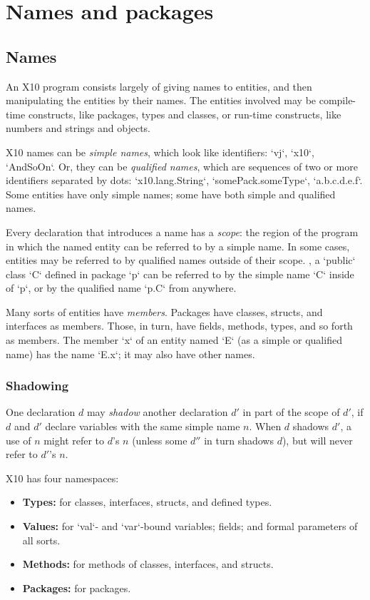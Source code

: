 \chapter{Names and packages}
\label{packages} 

\section{Names}

An X10 program consists largely of giving names to entities, and then
manipulating the entities by their names. The entities involved may be
compile-time constructs, like packages, types and classes, or run-time
constructs, like numbers and strings and objects.  

X10 names can be {\em simple names}, which look like identifiers: \xcd`vj`,
\xcd`x10`, \xcd`AndSoOn`. Or, they can be {\em qualified names}, which are
sequences of two or more identifiers separated by dots: \xcd`x10.lang.String`, 
\xcd`somePack.someType`, \xcd`a.b.c.d.e.f`.   Some entities have only simple
names; some have both simple and qualified names.

Every declaration that introduces a name has a {\em scope}: the region of the
program in which the named entity can be referred to by a simple name.  
In some cases, entities may be referred to by qualified names outside of their
scope.  \Eg, a \xcd`public` class \xcd`C` defined in package \xcd`p` can be
referred to by the simple name \xcd`C` inside of \xcd`p`, or by the qualified
name \xcd`p.C` from anywhere.  

Many sorts of entities have {\em members}.  Packages have classes, structs,
and interfaces as members.  Those, in turn, have fields, methods, types, and
so forth as members.  The member \xcd`x` of an entity named \xcd`E` (as a
simple or qualified name) has the name \xcd`E.x`; it may also have other
names.  

\subsection{Shadowing}

One declaration $d$ may {\em shadow} another declaration $d'$ in part of the
scope of $d'$, if $d$ and $d'$ declare variables with the same simple name $n$.
When $d$ shadows $d'$, a use of $n$ might refer to $d$'s $n$ (unless some
$d''$ in turn shadows $d$), but will never refer to $d'$'s $n$.

X10 has four namespaces:
\begin{itemize}
\item {\bf Types:} for classes, interfaces, structs, and defined types.
\item {\bf Values:} for \xcd`val`- and \xcd`var`-bound variables; fields;
      and formal parameters of all sorts.
\item {\bf Methods:} for methods of classes, interfaces, and structs.
\item {\bf Packages:} for packages.
\end{itemize}

